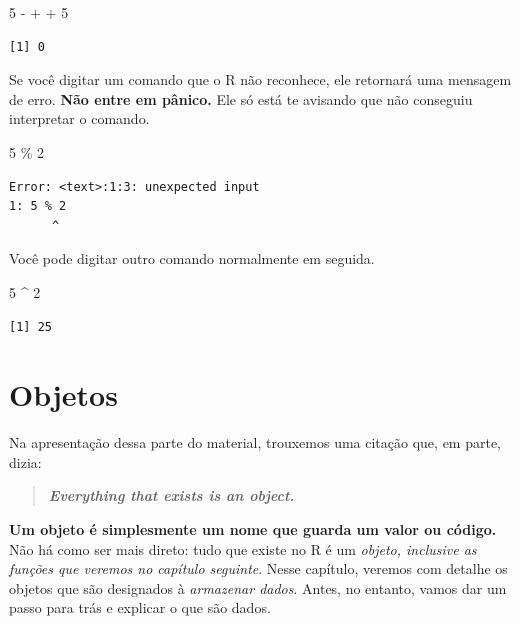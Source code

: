 \documentclass[
  letterpaper,
  DIV=11,
  numbers=noendperiod]{scrreprt}
\newenvironment{Shaded}{\begin{snugshade}}{\end{snugshade}}
\newcommand{\DecValTok}[1]{\textcolor[rgb]{0.68,0.00,0.00}{#1}}
\newcommand{\NormalTok}[1]{\textcolor[rgb]{0.00,0.23,0.31}{#1}}
\newcommand{\SpecialCharTok}[1]{\textcolor[rgb]{0.37,0.37,0.37}{#1}}
\begin{document}
\begin{Shaded}
\begin{Highlighting}[]
\DecValTok{5} \SpecialCharTok{{-}}
\SpecialCharTok{+} 
\SpecialCharTok{+} \DecValTok{5}
\end{Highlighting}
\end{Shaded}

\begin{verbatim}
[1] 0
\end{verbatim}

Se você digitar um comando que o R não reconhece, ele retornará uma
mensagem de erro. \textbf{Não entre em pânico.} Ele só está te avisando
que não conseguiu interpretar o comando.

\begin{Shaded}
\begin{Highlighting}[]
\DecValTok{5}\NormalTok{ \% }\DecValTok{2}
\end{Highlighting}
\end{Shaded}

\begin{verbatim}
Error: <text>:1:3: unexpected input
1: 5 % 2
      ^
\end{verbatim}

Você pode digitar outro comando normalmente em seguida.

\begin{Shaded}
\begin{Highlighting}[]
\DecValTok{5} \SpecialCharTok{\^{}} \DecValTok{2}
\end{Highlighting}
\end{Shaded}

\begin{verbatim}
[1] 25
\end{verbatim}

\chapter{Objetos}\label{objetos}

Na apresentação dessa parte do material, trouxemos uma citação que, em
parte, dizia:

\begin{quote}
\textbf{\emph{Everything that exists is an object.}}
\end{quote}

\textbf{Um objeto é simplesmente um nome que guarda um valor ou código.}
Não há como ser mais direto: tudo que existe no R é um \emph{objeto,
inclusive as funções que veremos no capítulo seguinte}. Nesse capítulo,
veremos com detalhe os objetos que são designados à \emph{armazenar
dados}. Antes, no entanto, vamos dar um passo para trás e explicar o que
são dados.
\end{document}

